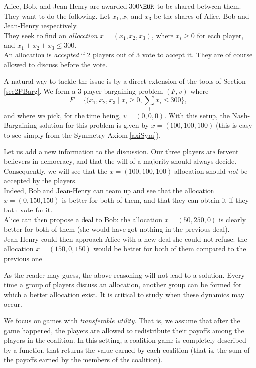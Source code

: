 \begin{example}
\label{exCoal1}
Alice, Bob, and Jean-Henry are awarded 300$\EUR$ to be shared between them.
They want to do the following. Let $x_1, x_2$ and $x_3$ be the shares of Alice, Bob and Jean-Henry respectively.\\
They seek to find an \emph{allocation} $x = (x_1, x_2, x_3)$, where $x_i \geq 0$ for each player, and $x_1 + x_2 +x_3  \leq 300$.\\
An allocation is \emph{accepted} if $2$ players out of $3$ vote to accept it. They are of course allowed to discuss before the vote.

A natural way to tackle the issue is by a direct extension of the tools of Section \ref{sec2PBarg}. We form a 3-player bargaining problem $(F,v)$ where
$$ F = \{(x_1, x_2, x_3 \mid x_i \geq 0, \sum_i x_i \leq 300\},$$
and where we pick, for the time being, $v = (0,0,0)$. With this setup, the Nash-Bargaining solution for this problem is given by $x = (100,100,100)$ (this is easy to see simply from the Symmetry Axiom \ref{axiSym}).

Let us add a new information to the discussion. Our three players are fervent believers in democracy, and that the will of a majority should always decide. Consequently, we will see that the $x = (100,100,100)$ allocation should \emph{not} be accepted by the players.\\
Indeed, Bob and Jean-Henry can team up and see that the allocation $x = (0,150,150)$ is better for both of them, and that they can obtain it if they both vote for it. \\
Alice can then propose a deal to Bob: the allocation $x = (50, 250, 0)$ is clearly better for both of them (she would have got nothing in the previous deal).\\
Jean-Henry could then approach Alice with a new deal she could not refuse: the allocation $x = (150,0,150)$ would be better for both of them compared to the previous one!

As the reader may guess, the above reasoning will not lead to a solution. Every time a group of players  discuss an allocation, another group can be formed for which a better allocation exist. It is critical to study when these dynamics may occur.
\end{example}
We focus on games with \emph{transferable utility}. That is, we assume that after the game happened, the players are allowed to redistribute their payoffs among the players in the coalition.  In this setting, a coalition game is completely described by a function that returns the value earned by each coalition (that is, the sum of the payoffs earned by the members of the coalition).

